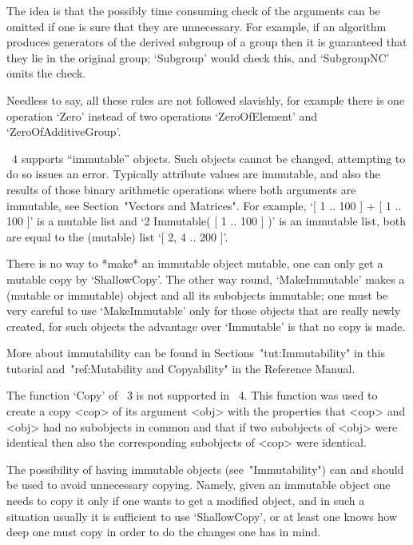 The idea is that the possibly time consuming check of the arguments
can be omitted if one is sure that they are unnecessary.
For example, if an algorithm produces generators of the derived subgroup
of a group then it is guaranteed that they lie in the original group;
`Subgroup' would check this, and `SubgroupNC' omits the check.

Needless to say, all these rules are not followed slavishly,
for example there is one operation `Zero' instead of two operations
`ZeroOfElement' and `ZeroOfAdditiveGroup'.



{\GAP}~4 supports ``immutable'' objects.  Such objects cannot be
changed, attempting to do so issues an error.  Typically attribute
values are immutable, and also the results of those binary arithmetic
operations where both arguments are immutable, see Section~"Vectors
and Matrices".  For example, `[ 1 .. 100 ] + [ 1 .. 100 ]' is a
mutable list and `2 \* Immutable( [ 1 .. 100 ] )' is an immutable
list, both are equal to the (mutable) list `[ 2, 4 .. 200 ]'.

There is no way to *make* an immutable object mutable, one can only
get a mutable copy by `ShallowCopy'.  The other way round,
`MakeImmutable' makes a (mutable or immutable) object and all its
subobjects immutable; one must be very careful to use `MakeImmutable'
only for those objects that are really newly created, for such objects
the advantage over `Immutable' is that no copy is made.

More about immutability can be found in Sections~"tut:Immutability" in
this tutorial and~"ref:Mutability and Copyability" in the Reference
Manual.



The function `Copy' of {\GAP}~3 is not supported in {\GAP}~4.  This
function was used to create a copy <cop> of its argument <obj> with
the properties that <cop> and <obj> had no subobjects in common and
that if two subobjects of <obj> were identical then also the
corresponding subobjects of <cop> were identical.

The possibility of having immutable objects (see~"Immutability") can and
should be used to avoid unnecessary copying.
Namely, given an immutable object one needs to copy it only if one wants
to get a modified object, and in such a situation usually it is
sufficient to use `ShallowCopy', or at least one knows how deep one must
copy in order to do the changes one has in mind.

